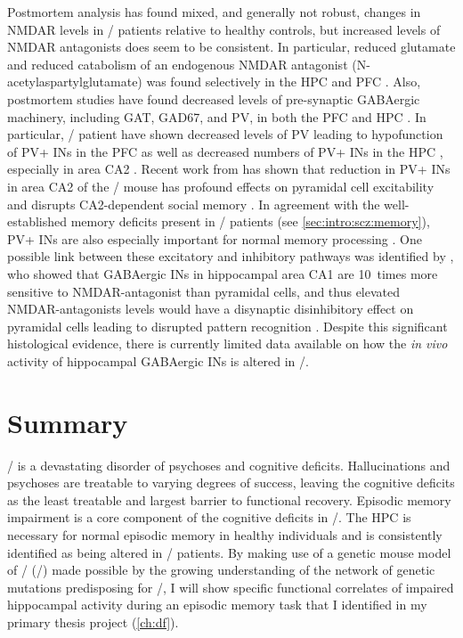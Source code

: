Postmortem analysis has found mixed, and generally not robust, changes in \ac{NMDAR} levels in \scz/ patients relative to healthy controls, but increased levels of \ac{NMDAR} antagonists does seem to be consistent.
In particular, reduced glutamate and reduced catabolism of an endogenous \ac{NMDAR} antagonist (N-acetylaspartylglutamate) was found selectively in the \ac{HPC} and \ac{PFC} \citep{Tsai1995}. 
Also, postmortem studies have found decreased levels of pre-synaptic GABAergic machinery, including GAT, GAD67, and \ac{PV}, in both the \ac{PFC} and HPC \citep{Coyle2006, Zhang2002, Konradi2011}.
In particular, \scz/ patient have shown decreased levels of \ac{PV} leading to hypofunction of \ac{PV}+ \acp{IN} in the \ac{PFC} as well as decreased numbers of \ac{PV}+ \acp{IN} in the HPC \citep{Zhang2002, Lewis2005}, especially in area CA2 \citep{Knable2004}.
Recent work from \citeauthor{Piskorowski2016} has shown that reduction in \ac{PV}+ \acp{IN} in area CA2 of the \df/ mouse has profound effects on pyramidal cell excitability and disrupts CA2-dependent social memory \citep{Piskorowski2016}.
In agreement with the well-established memory deficits present in \scz/ patients (see \autoref{sec:intro:scz:memory}), \ac{PV}+ \acp{IN} are also especially important for normal memory processing \citep{Korotkova2010, Murray2011, Donato2013}.
One possible link between these excitatory and inhibitory pathways was identified by \citeauthor{Grunze1996},  who showed that GABAergic \acp{IN} in hippocampal area CA1 are 10~times more sensitive to \ac{NMDAR}-antagonist than pyramidal cells, and thus elevated \ac{NMDAR}-antagonists levels would have a disynaptic disinhibitory effect on pyramidal cells leading to disrupted pattern recognition \citep{Grunze1996}.
Despite this significant histological evidence, there is currently limited data available on how the \textit{in vivo} activity of hippocampal GABAergic \acp{IN} is altered in \scz/.

\section{Summary}
\Scz/ is a devastating disorder of psychoses and cognitive deficits.
Hallucinations and psychoses are treatable to varying degrees of success, leaving the cognitive deficits as the least treatable and largest barrier to functional recovery.
Episodic memory impairment is a core component of the cognitive deficits in \scz/.
The \acl{HPC} is necessary for normal episodic memory in healthy individuals and is consistently identified as being altered in \scz/ patients.
By making use of a genetic mouse model of \scz/ (\df/) made possible by the growing understanding of the network of genetic mutations predisposing for \scz/, I will show specific functional correlates of impaired hippocampal activity during an episodic memory task that I identified in my primary thesis project (\autoref{ch:df}).
